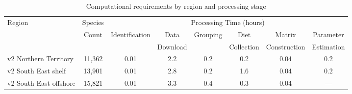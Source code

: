 \begin{table}[htbp]
\centering
\footnotesize
\caption{Computational requirements by region and processing stage}
\label{tab:timing_analysis}
\begin{tabular}{lccccccc}
\hline
Region & Species & \multicolumn{6}{c}{Processing Time (hours)} \\
\cline{3-8}
 & Count & Identification & Data & Grouping & Diet & Matrix & Parameter \\
 & & & Download & & Collection & Construction & Estimation \\
\hline
v2 Northern Territory & 11,362 & 0.01 & 2.2 & 0.2 & 0.2 & 0.04 & 0.2 \\
v2 South East shelf & 13,901 & 0.01 & 2.8 & 0.2 & 1.6 & 0.04 & 0.2 \\
v2 South East offshore & 15,821 & 0.01 & 3.3 & 0.4 & 0.3 & 0.04 & --- \\
\hline
\end{tabular}
\vspace{1ex}
\end{table}
